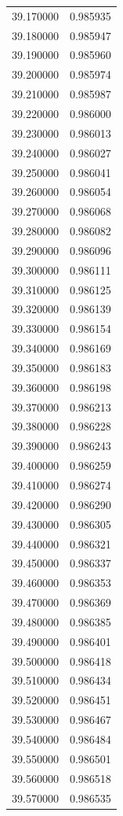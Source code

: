 \begin{tabular}{rr}
39.170000 & 0.985935 \\
39.180000 & 0.985947 \\
39.190000 & 0.985960 \\
39.200000 & 0.985974 \\
39.210000 & 0.985987 \\
39.220000 & 0.986000 \\
39.230000 & 0.986013 \\
39.240000 & 0.986027 \\
39.250000 & 0.986041 \\
39.260000 & 0.986054 \\
39.270000 & 0.986068 \\
39.280000 & 0.986082 \\
39.290000 & 0.986096 \\
39.300000 & 0.986111 \\
39.310000 & 0.986125 \\
39.320000 & 0.986139 \\
39.330000 & 0.986154 \\
39.340000 & 0.986169 \\
39.350000 & 0.986183 \\
39.360000 & 0.986198 \\
39.370000 & 0.986213 \\
39.380000 & 0.986228 \\
39.390000 & 0.986243 \\
39.400000 & 0.986259 \\
39.410000 & 0.986274 \\
39.420000 & 0.986290 \\
39.430000 & 0.986305 \\
39.440000 & 0.986321 \\
39.450000 & 0.986337 \\
39.460000 & 0.986353 \\
39.470000 & 0.986369 \\
39.480000 & 0.986385 \\
39.490000 & 0.986401 \\
39.500000 & 0.986418 \\
39.510000 & 0.986434 \\
39.520000 & 0.986451 \\
39.530000 & 0.986467 \\
39.540000 & 0.986484 \\
39.550000 & 0.986501 \\
39.560000 & 0.986518 \\
39.570000 & 0.986535 \\

\end{tabular}
